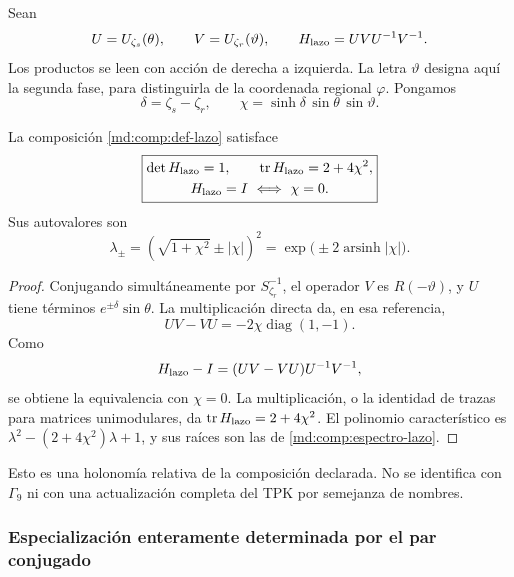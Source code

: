 Sean
\begin{equation}
 U=U_{\zeta_s}(\theta),\qquad
 V=U_{\zeta_r}(\vartheta),\qquad
 H_{\rm lazo}=UVU^{-1}V^{-1}.
 \label{md:comp:def-lazo}
\end{equation}
Los productos se leen con acción de derecha a izquierda.
La letra \(\vartheta\) designa aquí la segunda fase, para distinguirla
de la coordenada regional \(\varphi\). Pongamos
\[
 \delta=\zeta_s-\zeta_r,\qquad
 \chi=\sinh\delta\,\sin\theta\,\sin\vartheta.
\]

\begin{proposition}
\label{md:comp:prop-lazo}
La composición \eqref{md:comp:def-lazo} satisface
\begin{equation}
 \boxed{\begin{gathered}
 \det H_{\rm lazo}=1,\qquad
 \operatorname{tr}H_{\rm lazo}=2+4\chi^2,\\
 H_{\rm lazo}=I\ \Longleftrightarrow\ \chi=0.
 \end{gathered}}
 \label{md:comp:traza-lazo}
\end{equation}
Sus autovalores son
\begin{equation}
 \lambda_\pm=(\sqrt{1+\chi^2}\pm|\chi|)^2
 =\exp\bigl(\pm2\operatorname{arsinh}|\chi|\bigr).
 \label{md:comp:espectro-lazo}
\end{equation}
\end{proposition}
\begin{proof}
Conjugando simultáneamente por \(S_{\zeta_r}^{-1}\), el operador \(V\)
es \(R(-\vartheta)\), y \(U\) tiene términos
\(e^{\pm\delta}\sin\theta\). La multiplicación directa da, en esa
referencia,
\[
 UV-VU=-2\chi\operatorname{diag}(1,-1).
\]
Como
\[
 H_{\rm lazo}-I=(UV-VU)U^{-1}V^{-1},
\]
se obtiene la equivalencia con \(\chi=0\). La multiplicación, o la
identidad de trazas para matrices unimodulares, da
\(\operatorname{tr}H_{\rm lazo}=2+4\chi^2\).
El polinomio característico es
\(\lambda^2-(2+4\chi^2)\lambda+1\), y sus raíces son las de
\eqref{md:comp:espectro-lazo}.
\end{proof}

Esto es una holonomía relativa de la composición declarada.
No se identifica con \(\Gamma_9\) ni con una actualización completa
del TPK por semejanza de nombres.

\subsubsection{Especialización enteramente determinada por el par conjugado}
\label{md:comp:lazo-conjugado}

